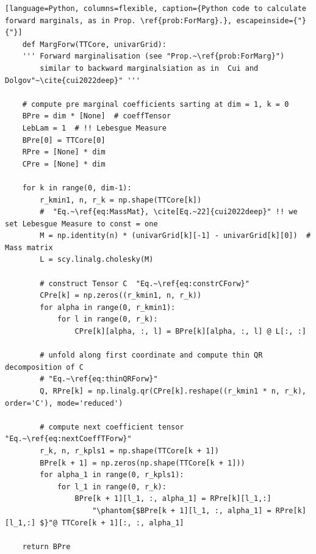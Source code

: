 \begin{lstlisting}[language=Python, columns=flexible, caption={Python code to calculate forward marginals, as in Prop. \ref{prob:ForMarg}.}, escapeinside={"}{"}]
	def MargForw(TTCore, univarGrid):
	''' Forward marginalisation (see "Prop.~\ref{prob:ForMarg}") 
		similar to backward marginalsiation as in  Cui and Dolgov"~\cite{cui2022deep}" '''
	
	# compute pre marginal coefficients sarting at dim = 1, k = 0
	BPre = dim * [None]  # coeffTensor
	LebLam = 1  # !! Lebesgue Measure
	BPre[0] = TTCore[0]
	RPre = [None] * dim
	CPre = [None] * dim
	
	for k in range(0, dim-1):
		r_kmin1, n, r_k = np.shape(TTCore[k])
		#  "Eq.~\ref{eq:MassMat}, \cite[Eq.~22]{cui2022deep}" !! we set Lebesgue Measure to const = one
		M = np.identity(n) * (univarGrid[k][-1] - univarGrid[k][0])  # Mass matrix
		L = scy.linalg.cholesky(M)
		
		# construct Tensor C  "Eq.~\ref{eq:constrCForw}"
		CPre[k] = np.zeros((r_kmin1, n, r_k))
		for alpha in range(0, r_kmin1):
			for l in range(0, r_k):
				CPre[k][alpha, :, l] = BPre[k][alpha, :, l] @ L[:, :]
		
		# unfold along first coordinate and compute thin QR decomposition of C
		# "Eq.~\ref{eq:thinQRForw}"
		Q, RPre[k] = np.linalg.qr(CPre[k].reshape((r_kmin1 * n, r_k), order='C'), mode='reduced')
		
		# compute next coefficient tensor  "Eq.~\ref{eq:nextCoeffTForw}"
		r_k, n, r_kpls1 = np.shape(TTCore[k + 1])
		BPre[k + 1] = np.zeros(np.shape(TTCore[k + 1]))
		for alpha_1 in range(0, r_kpls1):
			for l_1 in range(0, r_k):
				BPre[k + 1][l_1, :, alpha_1] = RPre[k][l_1,:] 
					"\phantom{$BPre[k + 1][l_1, :, alpha_1] = RPre[k][l_1,:] $}"@ TTCore[k + 1][:, :, alpha_1]
		
	return BPre
	
\end{lstlisting}


